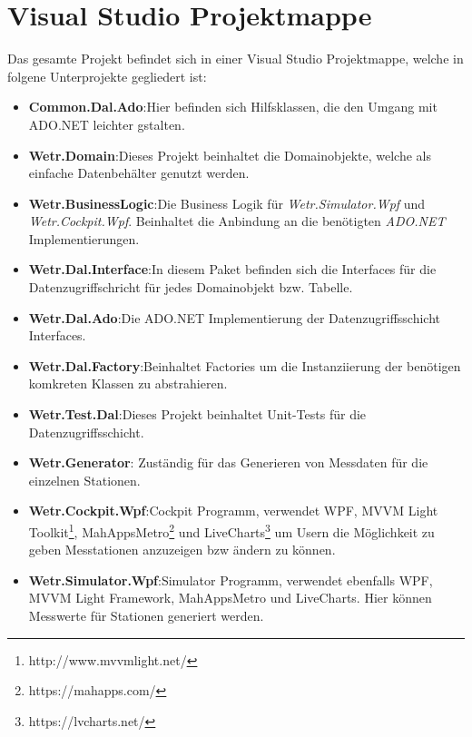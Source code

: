 \section{Visual Studio Projektmappe}

Das gesamte Projekt befindet sich in einer Visual Studio Projektmappe, welche in folgene Unterprojekte gegliedert ist:
\begin{itemize}
    \item \textbf{Common.Dal.Ado}:\newline Hier befinden sich Hilfsklassen, die den Umgang mit ADO.NET leichter gstalten.
    \item \textbf{Wetr.Domain}:\newline Dieses Projekt beinhaltet die Domainobjekte, welche als einfache Datenbehälter genutzt werden.
    \item \textbf{Wetr.BusinessLogic}:\newline Die Business Logik für \textit{Wetr.Simulator.Wpf} und \textit{Wetr.Cockpit.Wpf}. Beinhaltet die Anbindung an die benötigten \textit{ADO.NET} Implementierungen.
    \item \textbf{Wetr.Dal.Interface}:\newline In diesem Paket befinden sich die Interfaces für die Datenzugriffschricht für jedes Domainobjekt bzw. Tabelle.
    \item \textbf{Wetr.Dal.Ado}:\newline Die ADO.NET Implementierung der Datenzugriffsschicht Interfaces.
    \item \textbf{Wetr.Dal.Factory}:\newline Beinhaltet Factories um die Instanziierung der benötigen komkreten Klassen zu abstrahieren.
    \item \textbf{Wetr.Test.Dal}:\newline Dieses Projekt beinhaltet Unit-Tests für die Datenzugriffsschicht.
    \item \textbf{Wetr.Generator}: Zuständig für das Generieren von Messdaten für die einzelnen Stationen.
    \item \textbf{Wetr.Cockpit.Wpf}:\newline Cockpit Programm, verwendet WPF, MVVM Light Toolkit\footnote{http://www.mvvmlight.net/}, MahAppsMetro\footnote{https://mahapps.com/} und LiveCharts\footnote{https://lvcharts.net/} um Usern die Möglichkeit zu geben Messtationen anzuzeigen bzw ändern zu können.
    \item \textbf{Wetr.Simulator.Wpf}:\newline Simulator Programm, verwendet ebenfalls WPF, MVVM Light Framework, MahAppsMetro und LiveCharts. Hier können Messwerte für Stationen generiert werden.
\end{itemize}

